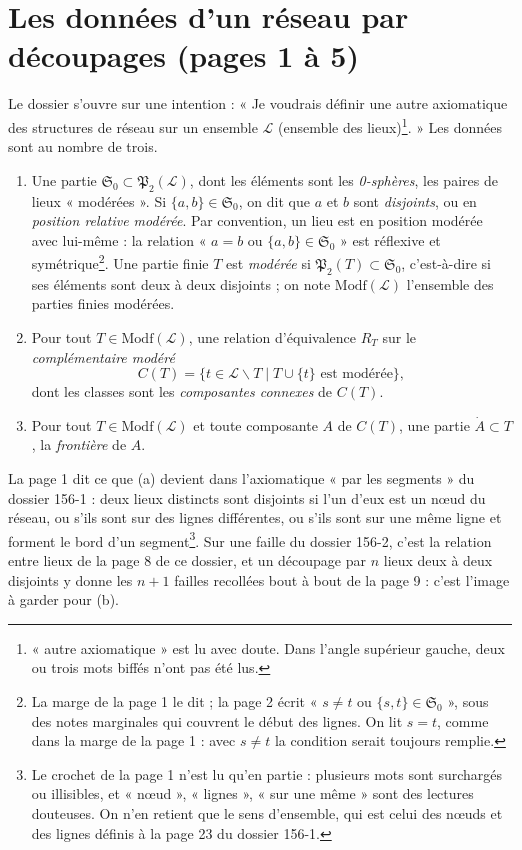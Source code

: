 \documentclass[11pt,a4paper]{article}
\begin{document}
\section*{Les données d'un réseau par découpages (pages 1 à 5)}

Le dossier s'ouvre sur une intention : « Je voudrais définir une autre
axiomatique des structures de réseau sur un ensemble $\mathcal{L}$ (ensemble
des lieux)\footnote{« autre axiomatique » est lu avec doute. Dans l'angle
supérieur gauche, deux ou trois mots biffés n'ont pas été lus.}. » Les données
sont au nombre de trois.

\begin{enumerate}
\item[(a)] Une partie $\mathfrak{S}_{0} \subset \mathfrak{P}_{2}(\mathcal{L})$,
dont les éléments sont les \emph{0-sphères}, les paires de lieux
« modérées ». Si $\{a,b\} \in \mathfrak{S}_{0}$, on dit que $a$ et $b$ sont
\emph{disjoints}, ou en \emph{position relative modérée}. Par convention, un lieu
est en position modérée avec lui-même : la relation « $a = b$ ou
$\{a,b\} \in \mathfrak{S}_{0}$ » est réflexive et symétrique\footnote{La marge de
la page 1 le dit ; la page 2 écrit « $s \neq t$ ou $\{s,t\} \in
\mathfrak{S}_{0}$ », sous des notes marginales qui couvrent le début des lignes.
On lit $s = t$, comme dans la marge de la page 1 : avec $s \neq t$ la condition
serait toujours remplie.}. Une partie finie $T$ est \emph{modérée} si
$\mathfrak{P}_{2}(T) \subset \mathfrak{S}_{0}$, c'est-à-dire si ses éléments sont
deux à deux disjoints ; on note $\mathrm{Modf}(\mathcal{L})$ l'ensemble des
parties finies modérées.
\item[(b)] Pour tout $T \in \mathrm{Modf}(\mathcal{L})$, une relation
d'équivalence $R_{T}$ sur le \emph{complémentaire modéré}
\[
C(T) = \{t \in \mathcal{L} \smallsetminus T \mid T \cup \{t\} \text{ est
modérée}\},
\]
dont les classes sont les \emph{composantes connexes} de $C(T)$.
\item[(c)] Pour tout $T \in \mathrm{Modf}(\mathcal{L})$ et toute composante $A$
de $C(T)$, une partie $\dot{A} \subset T$, la \emph{frontière} de $A$.
\end{enumerate}

La page 1 dit ce que (a) devient dans l'axiomatique « par les segments » du
dossier 156-1 : deux lieux distincts sont disjoints si l'un d'eux est un nœud du
réseau, ou s'ils sont sur des lignes différentes, ou s'ils sont sur une même
ligne et forment le bord d'un segment\footnote{Le crochet de la page 1 n'est lu
qu'en partie : plusieurs mots sont surchargés ou illisibles, et « nœud »,
« lignes », « sur une même » sont des lectures douteuses. On n'en retient que
le sens d'ensemble, qui est celui des nœuds et des lignes définis à la page 23
du dossier 156-1.}. Sur une faille du dossier 156-2, c'est la relation entre
lieux de la page 8 de ce dossier, et un découpage par $n$ lieux deux à deux
disjoints y donne les $n+1$ failles recollées bout à bout de la page 9 : c'est
l'image à garder pour (b).
\end{document}
